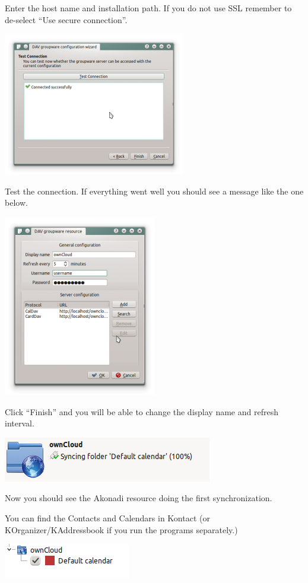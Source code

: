 \documentclass[letterpaper,10pt,english]{sphinxmanual}
\begin{document}
Enter the host name and installation path. If you do not use SSL
remember to de-select ``Use secure connection''.

\includegraphics{kdes5.png}

Test the connection. If everything went well you should see a message
like the one below.

\includegraphics{kdes6.png}

Click ``Finish'' and you will be able to change the display name and
refresh interval.

\includegraphics{kdes7.png}

Now you should see the Akonadi resource doing the first
synchronization.

You can find the Contacts and Calendars in Kontact (or
KOrganizer/KAddressbook if you run the programs separately.)

\includegraphics{kdes9.png}
\end{document}
